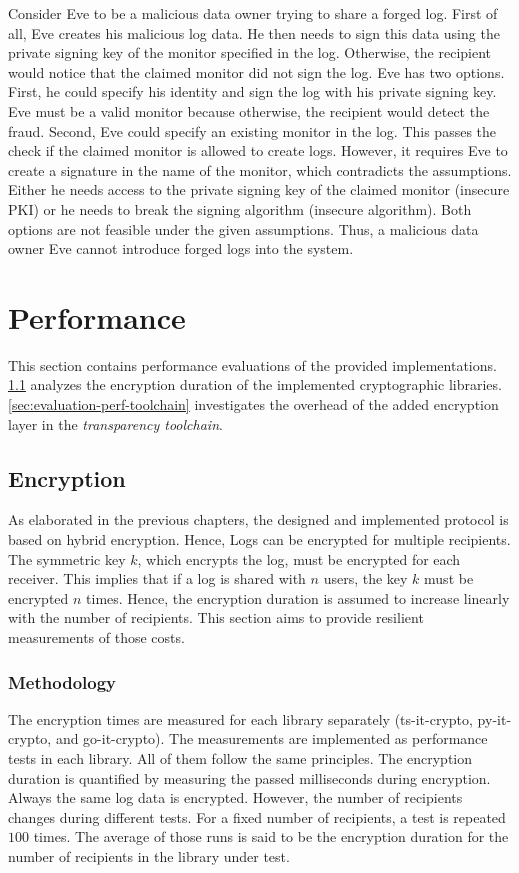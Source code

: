 \documentclass[../main.tex]{subfiles}
\begin{document}
Consider Eve to be a malicious data owner trying to share a forged log.
First of all, Eve creates his malicious log data.
He then needs to sign this data using the private signing key of the monitor specified in the log.
Otherwise, the recipient would notice that the claimed monitor did not sign the log.
Eve has two options.
First, he could specify his identity and sign the log with his private signing key.
Eve must be a valid monitor because otherwise, the recipient would detect the fraud.
Second, Eve could specify an existing monitor in the log.
This passes the check if the claimed monitor is allowed to create logs.
However, it requires Eve to create a signature in the name of the monitor, which contradicts the assumptions.
Either he needs access to the private signing key of the claimed monitor (insecure PKI) or he needs to break the signing algorithm (insecure algorithm).
Both options are not feasible under the given assumptions.
Thus, a malicious data owner Eve cannot introduce forged logs into the system.

\section{Performance}
\label{sec:evaluation-perf}
This section contains performance evaluations of the provided implementations.
\cref{sec:evaluation-perf-enc} analyzes the encryption duration of the implemented cryptographic libraries.
\cref{sec:evaluation-perf-toolchain} investigates the overhead of the added encryption layer in the \emph{transparency toolchain}.

\subsection{Encryption}
\label{sec:evaluation-perf-enc}
As elaborated in the previous chapters, the designed and implemented protocol is based on hybrid encryption.
Hence, Logs can be encrypted for multiple recipients.
The symmetric key $k$, which encrypts the log, must be encrypted for each receiver.
This implies that if a log is shared with $n$ users, the key $k$ must be encrypted $n$ times.
Hence, the encryption duration is assumed to increase linearly with the number of recipients.
This section aims to provide resilient measurements of those costs.

\subsubsection{Methodology}
The encryption times are measured for each library separately (ts-it-crypto, py-it-crypto, and go-it-crypto).
The measurements are implemented as performance tests in each library.
All of them follow the same principles.
The encryption duration is quantified by measuring the passed milliseconds during encryption.
Always the same log data is encrypted.
However, the number of recipients changes during different tests.
For a fixed number of recipients, a test is repeated $100$ times.
The average of those runs is said to be the encryption duration for the number of recipients in the library under test.
\end{document}
